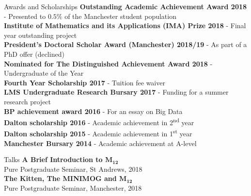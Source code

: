 \documentclass{resume} %
\begin{document}
\vspace{0.3cm}

\begin{rSection}{Awards and Scholarships}
\textbf{Outstanding Academic Achievement Award 2018} - Presented to $0.5 \%$ of the Manchester student population \\
\textbf{Institute of Mathematics and its Applications (IMA) Prize 2018} - Final year outstanding project\\
\textbf{President's Doctoral Scholar Award (Manchester) 2018/19} - As part of a PhD offer (declined)\\
\textbf{Nominated for The Distinguished Achievement Award 2018} - Undergraduate of the Year\\
\textbf{Fourth Year Scholarship 2017} - Tuition fee waiver \\
\textbf{LMS Undergraduate Research Bursary 2017} - Funding for a summer research project\\
\textbf{BP achievement award 2016} - For an essay on Big Data\\
\textbf{Dalton scholarship 2016} - Academic achievement in 2\textsuperscript{nd} year\\
\textbf{Dalton scholarship 2015} -  Academic achievement in 1\textsuperscript{st} year\\
\textbf{Manchester Bursary 2014} - Academic achievement at A-level
\end{rSection}
\vspace{0.3cm}
\newpage
\begin{rSection}{Talks}
\textbf{A Brief Introduction to $\mathbf{M_{12}}$}\\ Pure Postgraduate Seminar, St Andrews, 2018\\
\textbf{The Kitten, The MINIMOG and $\mathbf{M_{12}}$}\\ Pure Postgraduate Seminar, Manchester, 2018
\end{rSection}
\end{document}
